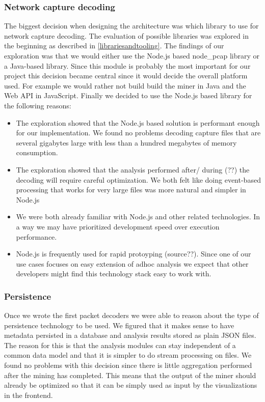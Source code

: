\subsubsection{Network capture decoding}
The biggest decision when designing the architecture was which library to use for network capture decoding. The evaluation of possible libraries was explored in the beginning as described in \ref{librariesandtooling}. The findings of our exploration was that we would either use the Node.js based node\_pcap library or a Java-based library. Since this module is probably the most important for our project this decision became central since it would decide the overall platform used. For example we would rather not build build the miner in Java and the Web API in JavaScript.
Finally we decided to use the Node.js based library for the following reasons:
\begin{itemize}
    \item The exploration showed that the Node.js based solution is performant enough for our implementation. We found no problems decoding capture files that are several gigabytes large with less than a hundred megabytes of memory consumption. 
    \item The exploration showed that the analysis performed after/ during (??) the decoding will require careful optimization. We both felt like doing event-based processing that works for very large files was more natural and simpler in Node.js
    \item We were both already familiar with Node.js and other related technologies. In a way we may have prioritized development speed over execution performance.
    \item Node.js is frequently used for rapid protoyping (source??). Since one of our use cases focuses on easy extension of adhoc analysis we expect that other developers might find this technology stack easy to work with.
\end{itemize}{}
\subsubsection{Persistence}
Once we wrote the first packet decoders we were able to reason about the type of persistence technology to be used. We figured that it makes sense to have metadata persisted in a database and analysis results stored as plain JSON files. The reason for this is that the analysis modules can stay independent of a common data model and that it is simpler to do stream processing on files. We found no problems with this decision since there is little aggregation performed after the mining has completed. This means that the output of the miner should already be optimized so that it can be simply used as input by the visualizations in the frontend.
